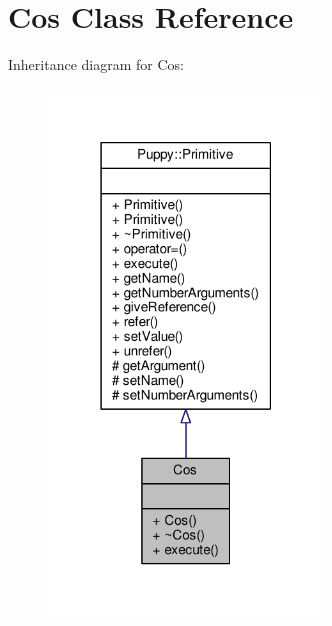 \hypertarget{classCos}{}\section{Cos Class Reference}
\label{classCos}


Inheritance diagram for Cos\+:
\nopagebreak
\begin{figure}[H]
\begin{center}
\leavevmode
\includegraphics[width=207pt]{classCos__inherit__graph}
\end{center}
\end{figure}


